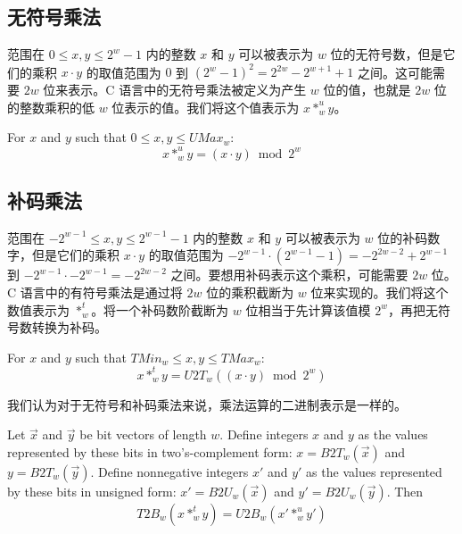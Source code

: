 \subsection{无符号乘法}

范围在 $0 \leq x, y \leq 2^w - 1$ 内的整数 $x$ 和 $y$ 可以被表示为 $w$ 位的无符号数，但是它们的乘积 $x \cdot y$ 的取值范围为 $0$ 到 $(2^w - 1)^2 = 2^{2w} - 2^{w+1} + 1$ 之间。这可能需要 $2w$ 位来表示。C 语言中的无符号乘法被定义为产生 $w$ 位的值，也就是 $2w$ 位的整数乘积的低 $w$ 位表示的值。我们将这个值表示为 $x *^u_w y$。

\begin{theorem}
    For $x$ and $y$ such that $0 \leq x, y \leq UMax_w$:
    \begin{equation}
        x *^u_w y = (x \cdot y) \bmod 2^w
        \label{thm:mulu}
    \end{equation}
\end{theorem}

\subsection{补码乘法}

范围在 $-2^{w-1} \leq x, y \leq 2^{w-1} - 1$ 内的整数 $x$ 和 $y$ 可以被表示为 $w$ 位的补码数字，但是它们的乘积 $x \cdot y$ 的取值范围为 $-2^{w-1} \cdot (2^{w-1} - 1) = -2^{2w-2} + 2^{w-1}$ 到 $-2^{w-1} \cdot -2^{w-1} = -2^{2w-2}$ 之间。要想用补码表示这个乘积，可能需要 $2w$ 位。C 语言中的有符号乘法是通过将 $2w$ 位的乘积截断为 $w$ 位来实现的。我们将这个数值表示为 $*^t_w$。将一个补码数阶截断为 $w$ 位相当于先计算该值模 $2^w$，再把无符号数转换为补码。

\begin{theorem}
    For $x$ and $y$ such that $TMin_w \leq x, y \leq TMax_w$:
    \begin{equation}
        x *^t_w y = U2T_w((x \cdot y) \bmod 2^w)
        \label{thm:muls}
    \end{equation}
\end{theorem}

我们认为对于无符号和补码乘法来说，乘法运算的二进制表示是一样的。

\begin{theorem}
    Let $\vec{x}$ and $\vec{y}$ be bit vectors of length $w$. Define integers $x$ and $y$ as the values represented by these bits in two's-complement form: $x = B2T_w(\vec{x})$ and $y = B2T_w(\vec{y})$. Define nonnegative integers $x'$ and $y'$ as the values represented by these bits in unsigned form: $x' = B2U_w(\vec{x})$ and $y' = B2U_w(\vec{y})$. Then
    \[
        T2B_w(x *^t_w y) = U2B_w(x' *^u_w y')
    \]
\end{theorem}

